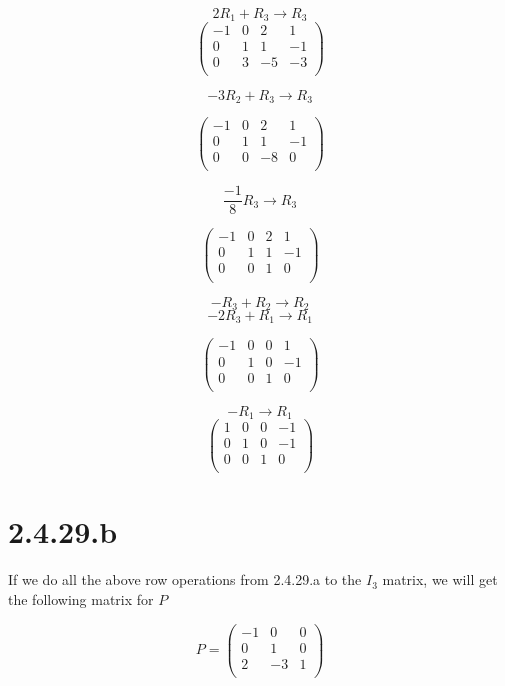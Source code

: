 \documentclass{article}
\begin{document}
\[	2R_1 + R_3 \rightarrow R_3		\]
\[
	\left(
		\begin{array}{cccc}
			-1&	0&	2&	1\\
			0&	1&	1&	-1\\
			0&	3&	-5&	-3\\
		\end{array}
	\right)
\]

\[	-3R_2 + R_3 \rightarrow R_3		\]		

\[
	\left(
		\begin{array}{cccc}
			-1&	0&	2&	1\\
			0&	1&	1&	-1\\
			0&	0&	-8&	0\\
		\end{array}
	\right)
\]

\[	\frac{-1}{8}R_3 \rightarrow R_3		\]

\[
	\left(
		\begin{array}{cccc}
			-1&	0&	2&	1\\
			0&	1&	1&	-1\\
			0&	0&	1&	0\\
		\end{array}
	\right)
\]

\[	-R_3 + R_2 \rightarrow R_2 \]
\[	-2R_3 + R_1 \rightarrow R_1 \]

\[
	\left(
		\begin{array}{cccc}
			-1&	0&	0&	1\\
			0&	1&	0&	-1\\
			0&	0&	1&	0\\
		\end{array}
	\right)
\]

\[	-R_1 \rightarrow R_1	\]
\[
	\left(
		\begin{array}{cccc}
			1&	0&	0&	-1\\
			0&	1&	0&	-1\\
			0&	0&	1&	0\\
		\end{array}
	\right)
\]
\newpage

\section*{2.4.29.b}
If we do all the above row operations from 2.4.29.a to the $I_3$ matrix, we will get the following matrix for $P$

\[
	P = \left(
		\begin{array}{ccc}
			-1&	0&	0\\
			0&	1&	0\\
			2&	-3&	1\\
		\end{array}
	\right)
\]
\end{document}
